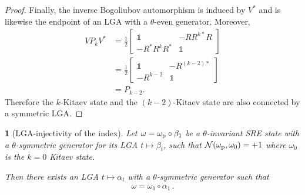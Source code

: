 \documentclass[a4paper,10pt]{article}
\numberwithin{equation}{section}
\theoremstyle{plain}
\newtheorem{thm}{\protect\theoremname}[section]
\theoremstyle{plain}
\theoremstyle{plain}
\theoremstyle{plain}
\theoremstyle{plain}
\theoremstyle{remark}
\theoremstyle{definition}
\providecommand{\theoremname}{Theorem}
\newcommand{\calN}{\mathcal{N}}
\newcommand{\Id}{\mathds{1}}
\newcommand{\eq}[1]{\begin{align*}#1\end{align*}}
\newcommand{\eql}[1]{\begin{align}#1\end{align}}
\begin{document}
\begin{proof}
Finally, the inverse Bogoliubov automorphism is induced by $V^\ast$ and
is likewise the endpoint of an LGA with a $\theta$-even generator.
Moreover,
\eq{
VP_kV^\ast
&=
\frac{1}{2}
\begin{bmatrix}
\Id
&
-RR^{k\ast}R
\\
-R^\ast R^kR^\ast
&
\Id
\end{bmatrix}\\
&=
\frac{1}{2}
\begin{bmatrix}
\Id
&
-R^{(k-2)\ast}
\\
-R^{k-2}
&
\Id
\end{bmatrix}\\
&=
P_{k-2}.
}
Therefore the $k$-Kitaev state and the $(k-2)$-Kitaev state are also
connected by a symmetric LGA.
\end{proof}

\begin{thm}[LGA-injectivity of the index] Let $\omega=\omega_{\rm p}\circ\beta_1$ be a $\theta$-invariant SRE state with a $\theta$-symmetric generator for its LGA $t\mapsto\beta_t$, such that $\calN(\omega_{\rm p},\omega_0)=+1$ where $\omega_0$ is the $k=0$ Kitaev state.

Then there exists an LGA $t\mapsto \alpha_t$ with a $\theta$-symmetric generator such that 
\eql{\omega = \omega_0\circ\alpha_1\,.} 
\end{thm}
\end{document}
